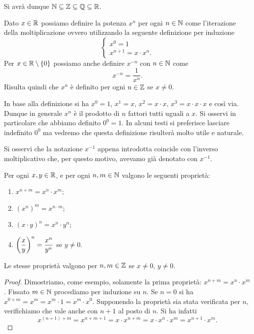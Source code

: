 Si avrà dunque $\mathbb N \subseteq \mathbb Z \subseteq \mathbb Q \subseteq \mathbb R$.

\begin{definition}
Dato $x \in \mathbb R$ possiamo definire la potenza $x^n$ per ogni
$n\in \mathbb N$ come l'iterazione della moltiplicazione
ovvero utilizzando
la seguente definizione per induzione
\[
\begin{cases}
  x^0 = 1\\
  x^{n+1} = x\cdot x^n.
\end{cases}
\]
Per $x\in \mathbb R\setminus\{0\}$ possiamo anche definire $x^{-n}$ con $n\in \mathbb N$
come
\[
x^{-n} = \frac{1}{x^n}.
\]
Risulta quindi che $x^n$ è definito per ogni $n\in \mathbb Z$ se $x\neq 0$.
\end{definition}

In base alla definizione si ha $x^0 = 1$, $x^1=x$, $x^2=x\cdot x$,
$x^3=x\cdot x \cdot x$ e così via. Dunque in generale
$x^n$ è il prodotto di $n$ fattori tutti uguali a $x$.
Si osservi in particolare che abbiamo definito $0^0=1$.
In alcuni testi si preferisce lasciare indefinito $0^0$
ma vedremo che questa definizione risulterà
molto utile e naturale.

Si osservi che la notazione
$x^{-1}$ appena introdotta coincide
con l'inverso moltiplicativo che, per questo motivo, avevamo già denotato
con $x^{-1}$.

\begin{theorem}
Per ogni $x,y\in \mathbb R$, e per ogni $n,m \in \mathbb N$
valgono le seguenti proprietà:
\begin{enumerate}
  \item  $x^{n+m} = x^n \cdot x^m$;
  \item $(x^n)^m = x^{n\cdot m}$;
  \item $(x\cdot y)^n = x^n \cdot y^n$;
  \item $\displaystyle {\left( \frac{x}{y} \right)}^n = \frac{x^n}{y^n}$ se $y\neq 0$.
\end{enumerate}
Le stesse proprietà valgono per $n,m \in\mathbb Z$ se $x\neq 0$, $y\neq 0$.
\end{theorem}
%
\begin{proof}
Dimostriamo, come esempio, solamente la prima proprietà: $x^{n+m} = x^n \cdot x^m$.
Fissato $m\in \mathbb N$ procediamo per induzione su $n$.
Se $n=0$ si ha $x^{0+m} = x^m = x^m \cdot 1 = x^m \cdot x^0$.
Supponendo la proprietà sia stata verificata per $n$, verifichiamo
che vale anche con $n+1$ al posto di $n$. Si ha infatti
\[
 x^{(n+1)+m} = x^{n+m+1} = x \cdot x^{n+m} = x \cdot x^n \cdot x^m
  = x^{n+1} \cdot x^m.
\]
\end{proof}

